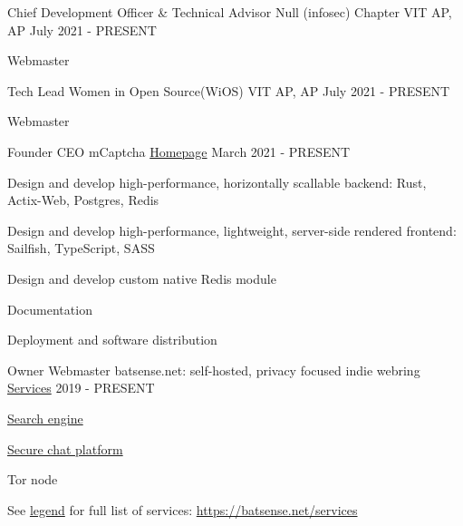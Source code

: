 
\begin{cventries}
     \cventry
    {Chief Development Officer \& Technical Advisor} %
    {Null (infosec) Chapter} %
    {VIT AP, AP} %
    {July 2021 - PRESENT} %
    {
      \begin{cvitems} %
       \item {Webmaster}
      \end{cvitems}
    }
 
     \cventry
    {Tech Lead} %
    {Women in Open Source(WiOS)} %
    {VIT AP, AP} %
    {July 2021 - PRESENT} %
    {
      \begin{cvitems} %
       \item {Webmaster}
      \end{cvitems}
    }
     \cventry
    {Founder CEO} %
    {mCaptcha} %
    {\href{https://mcaptcha.org}{Homepage}} %
    {March 2021 - PRESENT} %
    {
      \begin{cvitems}%
        \item {Design and develop high-performance, horizontally scallable backend: Rust, Actix-Web, Postgres, Redis}
        \item {Design and develop high-performance, lightweight, server-side rendered frontend: Sailfish, TypeScript, SASS}
        \item {Design and develop custom native Redis module}
        \item {Documentation}
        \item {Deployment and software distribution}
      \end{cvitems}
    }
    
    \cventry
    {Owner Webmaster} %
    {batsense.net: self-hosted, privacy focused indie webring} %
    {\href{https://batsense.net/services}{Services}} %
    {2019 - PRESENT} %
    {
      \begin{cvitems}%
        \item {{\href{https://searx.batsense.net}{Search engine}}}
        \item {{\href{https://matrix.batsense.net}{Secure chat platform}}}
        \item {Tor node}
        \item {See {\href{https://batsense.net/services}{legend} for full list of services}: \href{https://batsense.net/services}{https://batsense.net/services}}
       \end{cvitems}
    }


\end{cventries}
